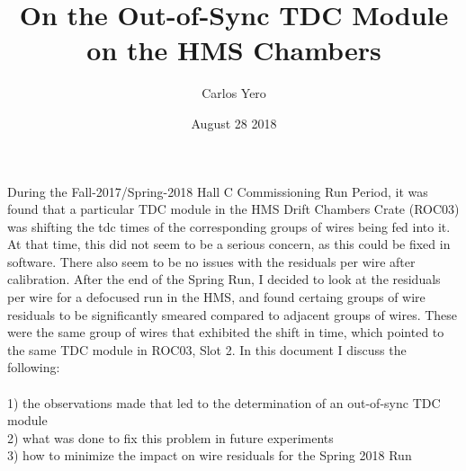 \documentclass[11pt]{article}
\title{On the Out-of-Sync TDC Module on the HMS Chambers}
\author{Carlos Yero}
\date{August 28 2018}
\begin{document}
\maketitle



During the Fall-2017/Spring-2018 Hall C Commissioning Run Period, it was found that a particular TDC module in the HMS
Drift Chambers Crate (ROC03) was shifting the tdc times of the corresponding groups of wires being fed into it. At that time,
this did not seem to be a serious concern, as this could be fixed in software. There also seem to be no issues with the
residuals per wire after calibration. After the end of the Spring Run, I decided to look at the residuals per wire for a defocused
run in the HMS, and found certaing groups of wire residuals to be significantly smeared compared to adjacent groups of wires.
These were the same group of wires that exhibited the shift in time, which pointed to the same TDC module in ROC03, Slot 2.
In this document I discuss the following: \\
\\
1) the observations made that led to the determination of an out-of-sync TDC module \\
2) what was done to fix this problem in future experiments \\
3) how to minimize the impact on wire residuals for the Spring 2018 Run
\end{document}
